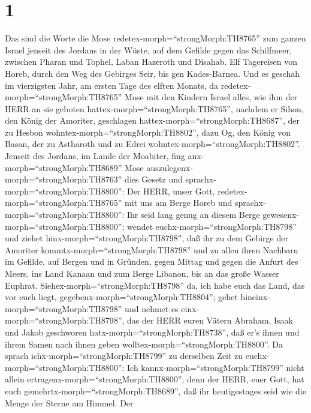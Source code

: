 \hypertarget{section}{%
\section{1}\label{section}}

 Das sind die Worte die Mose
redetex-morph=``strongMorph:TH8765'' zum ganzen Israel jenseit des
Jordans in der Wüste, auf dem Gefilde gegen das Schilfmeer, zwischen
Pharan und Tophel, Laban Hazeroth und Disahab.  Elf
Tagereisen von Horeb, durch den Weg des Gebirges Seir, bis gen
Kades-Barnea.  Und es geschah im vierzigsten Jahr, am ersten
Tage des elften Monats, da redetex-morph=``strongMorph:TH8765'' Mose mit
den Kindern Israel alles, wie ihm der HERR an sie geboten
hattex-morph=``strongMorph:TH8765'',  nachdem er Sihon, den
König der Amoriter, geschlagen hattex-morph=``strongMorph:TH8687'', der
zu Hesbon wohntex-morph=``strongMorph:TH8802'', dazu Og, den König von
Basan, der zu Astharoth und zu Edrei
wohntex-morph=``strongMorph:TH8802''.  Jenseit des Jordans,
im Lande der Moabiter, fing anx-morph=``strongMorph:TH8689'' Mose
auszulegenx-morph=``strongMorph:TH8763'' dies Gesetz und
sprachx-morph=``strongMorph:TH8800'':  Der HERR, unser Gott,
redetex-morph=``strongMorph:TH8765'' mit uns am Berge Horeb und
sprachx-morph=``strongMorph:TH8800'': Ihr seid lang genug an diesem
Berge gewesenx-morph=``strongMorph:TH8800'';  wendet
euchx-morph=``strongMorph:TH8798'' und ziehet
hinx-morph=``strongMorph:TH8798'', daß ihr zu dem Gebirge der Amoriter
kommtx-morph=``strongMorph:TH8798'' und zu allen ihren Nachbarn im
Gefilde, auf Bergen und in Gründen, gegen Mittag und gegen die Anfurt
des Meers, ins Land Kanaan und zum Berge Libanon, bis an das große
Wasser Euphrat.  Siehex-morph=``strongMorph:TH8798'' da, ich
habe euch das Land, das vor euch liegt,
gegebenx-morph=``strongMorph:TH8804''; gehet
hineinx-morph=``strongMorph:TH8798'' und nehmet es
einx-morph=``strongMorph:TH8798'', das der HERR euren Vätern Abraham,
Isaak und Jakob geschworen hatx-morph=``strongMorph:TH8738'', daß er's
ihnen und ihrem Samen nach ihnen geben
wolltex-morph=``strongMorph:TH8800''.  Da sprach
ichx-morph=``strongMorph:TH8799'' zu derselben Zeit zu
euchx-morph=``strongMorph:TH8800'': Ich
kannx-morph=``strongMorph:TH8799'' nicht allein
ertragenx-morph=``strongMorph:TH8800'';  denn der HERR,
euer Gott, hat euch gemehrtx-morph=``strongMorph:TH8689'', daß ihr
heutigestages seid wie die Menge der Sterne am Himmel.  Der

